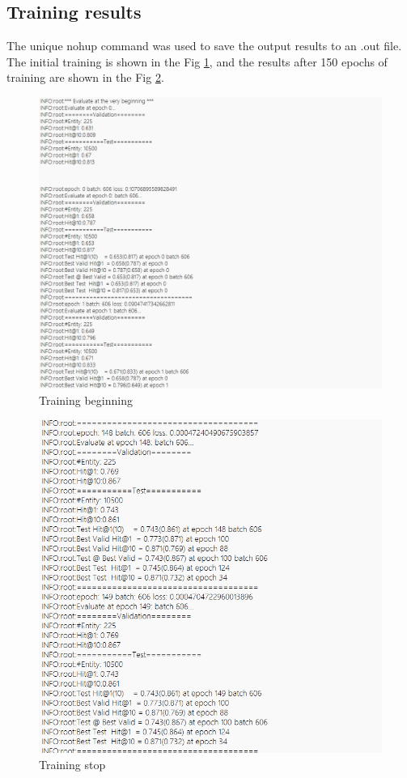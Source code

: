 \documentclass[sigconf]{acmart}
\begin{document}
{\subsection{Training results}
The unique nohup command was used to save the output results to an .out file. The initial training is shown in the Fig \ref{begin}, and the results after 150 epochs of training are shown in the Fig \ref{stop}.
\begin{figure}
    \centering
    \includegraphics[width=1\linewidth]{figure/b.png}
    \caption{Training beginning}
    \label{begin}
\end{figure}
\begin{figure}
    \centering
    \includegraphics[width=1\linewidth]{figure/e.png}
    \caption{Training stop}
    \label{stop}
\end{figure}

}
\end{document}
